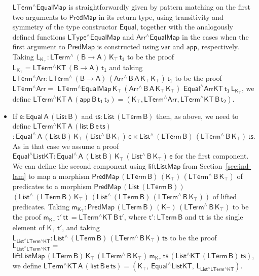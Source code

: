 \documentclass[9pt]{entcs}
\begin{document}
\begin{itemize}
  $\mathsf{LTerm^\wedge EqualMap}$ is straightforwardly given by
  pattern matching on the first two arguments to $\mathsf{PredMap}$ in
  its return type, using transitivity and symmetry of the type
  constructor $\mathsf{Equal}$, together with the analogously defined
  functions $\mathsf{LType^\wedge EqualMap}$ and $\mathsf{Arr^\wedge
    EqualMap}$ in the cases when the first argument to
  $\mathsf{PredMap}$ is constructed using $\mathsf{var}$ and
  $\mathsf{app}$, respectively. Taking $\mathsf{L_{K_\top} :
    LTerm^{\wedge}\, (B \to A) \, K_\top\, t_1}$ to be the proof
  $\mathsf{L_{K_\top} = LTerm^\wedge KT\, (B \to A)\, t_1}$ and taking
  $\mathsf{ LTerm^\wedge Arr : LTerm^{\wedge}\, (B \to A)\,
    (Arr^{\wedge} \, B\, A\, K_\top \, K_\top)\, t_1}$ to be the proof
  $\mathsf{LTerm^\wedge Arr =}$ $\mathsf{LTerm^\wedge
    EqualMap\,K_\top\,(Arr^{\wedge}\,B\,A\,K_\top\,K_\top)\,\,
    Equal^\wedge ArrKT\, t_1\, L_{K_\top}}$, we define
  $\mathsf{LTerm^\wedge KT\,A\, (app\, B\, t_1\, t_2) = (K_\top ,
    LTerm^\wedge Arr , LTerm^\wedge KT\,B\,t_2)}$.
\item If $\mathsf{e : Equal\,A\,(List\,B)}$ and $\mathsf{ts :
  List\,(LTerm\, B)}$ then, as above, we need to define
  $\mathsf{LTerm^\wedge KT\,A\, (list\, B \,e\, ts)}$ $\mathsf{:
  Equal^{\wedge} \, A\, (List\,B)\, K_\top\, (List^{\wedge} \, B\,
  K_\top) \, e \times List^{\wedge}\, (LTerm\,B) \, (LTerm^{\wedge} \,
  B\, K_\top) \, ts }$.  As in that case we assume a proof
  $\mathsf{Equal^\wedge ListKT : Equal^{\wedge} \, A\, (List\,B)\, K_\top\,
  (List^{\wedge} \, B\, K_\top) \, e}$ for the first component.  We
  can define the second component using $\mathsf{liftListMap}$ from
  Section~\ref{sec:ind-lam} to map a morphism $\mathsf{PredMap\,
    (LTerm\,B)\, (K_\top)\, (LTerm^{\wedge}\,B\,K_\top)}$ of
  predicates to a morphism $\mathsf{PredMap\,(List\,(LTerm\,B))}$
  $\mathsf{(List^{\wedge}\,(LTerm\,B)\,K_\top) \,
    (List^{\wedge}\,(LTerm\,B)\, (LTerm^{\wedge}\,B\,K_\top))}$ of
  lifted predicates.  Taking $\mathsf{m_{K_\top} : PredMap\,
    (LTerm\,B) \, (K_\top)\, (LTerm^{\wedge}\,B\,K_\top)}$ to be the
  proof $\mathsf{m_{K_\top} \, t'\, tt\, = LTerm^\wedge KT\, B\, t'}$,
  where $\mathsf{t' : LTerm\,B}$ and $\mathsf{tt}$ is the single
  element of $\mathsf{K_\top\, t'}$, and taking
  $\mathsf{L_{List^\wedge LTerm^\wedge KT} : List^{\wedge}\,
    (LTerm\,B) \, (LTerm^{\wedge} \, B\, K_\top) \, ts}$ to be the
  proof $\mathsf{ L_{List^\wedge LTerm^\wedge KT} =}$
  $\mathsf{liftListMap \, (LTerm\,B) \, K_\top \, (LTerm^{\wedge}\,
    B\, K_\top) \, m_{K_\top} \, ts \, (List^\wedge KT\, (LTerm\, B)\,
    ts) }$, we define $\mathsf{LTerm^\wedge KT\,A\, (list\, B\, e\,
    ts) = (K_\top , \, Equal^\wedge ListKT , \, L_{List^\wedge
      LTerm^\wedge KT} ) }$.
\end{itemize}
\end{document}
